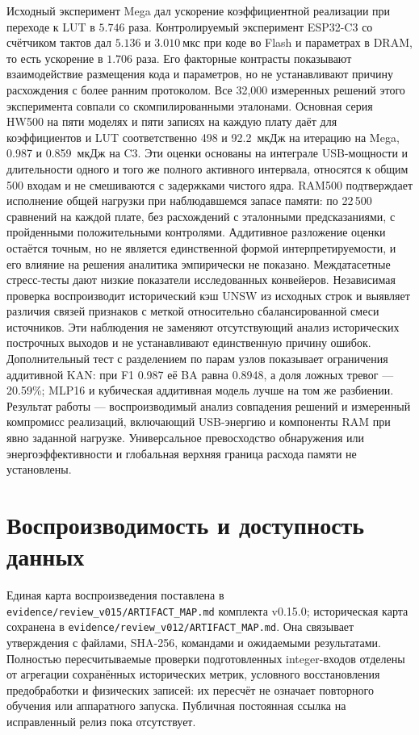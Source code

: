 Исходный эксперимент Mega дал ускорение коэффициентной реализации при переходе к LUT в $5.746$ раза. Контролируемый эксперимент ESP32-C3 со счётчиком тактов дал $5.136$ и $3.010~\text{мкс}$ при коде во Flash и параметрах в DRAM, то есть ускорение в $1.706$ раза. Его факторные контрасты показывают взаимодействие размещения кода и параметров, но не устанавливают причину расхождения с более ранним протоколом. Все 32,000 измеренных решений этого эксперимента совпали со скомпилированными эталонами. Основная серия HW500 на пяти моделях и пяти записях на каждую плату даёт для коэффициентов и LUT соответственно 498 и 92.2~мкДж на итерацию на Mega, 0.987 и 0.859~мкДж на C3. Эти оценки основаны на интеграле USB-мощности и длительности одного и того же полного активного интервала, относятся к общим 500 входам и не смешиваются с задержками чистого ядра. RAM500 подтверждает исполнение общей нагрузки при наблюдавшемся запасе памяти: по 22\,500 сравнений на каждой плате, без расхождений с эталонными предсказаниями, с пройденными положительными контролями. Аддитивное разложение оценки остаётся точным, но не является единственной формой интерпретируемости, и его влияние на решения аналитика эмпирически не показано. Междатасетные стресс-тесты дают низкие показатели исследованных конвейеров. Независимая проверка воспроизводит исторический кэш UNSW из исходных строк и выявляет различия связей признаков с меткой относительно сбалансированной смеси источников. Эти наблюдения не заменяют отсутствующий анализ исторических построчных выходов и не устанавливают единственную причину ошибок. Дополнительный тест с разделением по парам узлов показывает ограничения аддитивной KAN: при F1 0.987 её BA равна 0.8948, а доля ложных тревог --- 20.59\%; MLP16 и кубическая аддитивная модель лучше на том же разбиении. Результат работы --- воспроизводимый анализ совпадения решений и измеренный компромисс реализаций, включающий USB-энергию и компоненты RAM при явно заданной нагрузке. Универсальное превосходство обнаружения или энергоэффективности и глобальная верхняя граница расхода памяти не установлены.

\section*{Воспроизводимость и доступность данных}
Единая карта воспроизведения поставлена в \texttt{evidence/review\_v015/ARTIFACT\_MAP.md} комплекта v0.15.0; историческая карта сохранена в \texttt{evidence/review\_v012/ARTIFACT\_MAP.md}. Она связывает утверждения с файлами, SHA-256, командами и ожидаемыми результатами. Полностью пересчитываемые проверки подготовленных integer-входов отделены от агрегации сохранённых исторических метрик, условного восстановления предобработки и физических записей: их пересчёт не означает повторного обучения или аппаратного запуска. Публичная постоянная ссылка на исправленный релиз пока отсутствует.

